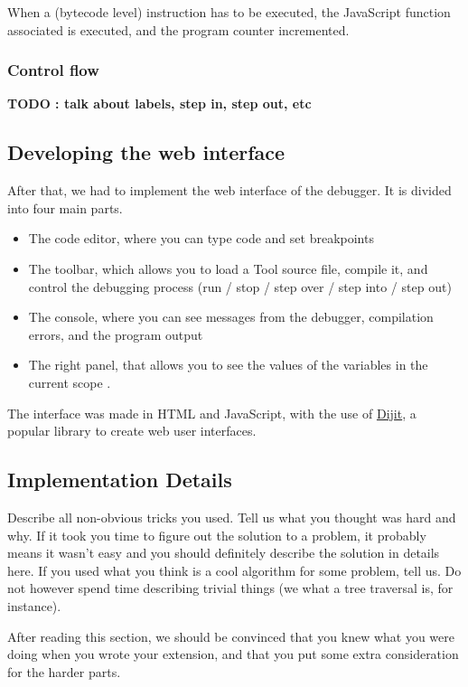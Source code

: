 When a (bytecode level) instruction has to be executed, the JavaScript function associated is executed, and the program counter incremented.

\subsubsection{Control flow}

\textbf{TODO : talk about labels, step in, step out, etc}

\subsection{Developing the web interface}

After that, we had to implement the web interface of the debugger. It is divided into four main parts.

\begin{itemize}
\item The code editor, where you can type code and set breakpoints
\item The toolbar, which allows you to load a Tool source file, compile it, and control the debugging process (run / stop / step over / step into / step out)
\item The console, where you can see messages from the debugger, compilation errors, and the program output
\item The right panel, that allows you to see the values of the variables in the current scope
\iftoggle{callstackdone}{%
	and the callstack
}{%
}.
\end{itemize}

The interface was made in HTML and JavaScript, with the use of \href{http://dojotoolkit.org/reference-guide/1.10/dijit/}{Dijit}, a popular library to create web user interfaces.

\subsection{Implementation Details}
Describe all non-obvious tricks you used. Tell us what you thought was hard and
why. If it took you time to figure out the solution to a problem, it probably
means it wasn't easy and you should definitely describe the solution in details
here. If you used what you think is a cool algorithm for some problem, tell us.
Do not however spend time describing trivial things (we what a tree traversal
is, for instance). 

After reading this section, we should be convinced that you knew what you were
doing when you wrote your extension, and that you put some extra consideration
for the harder parts.
